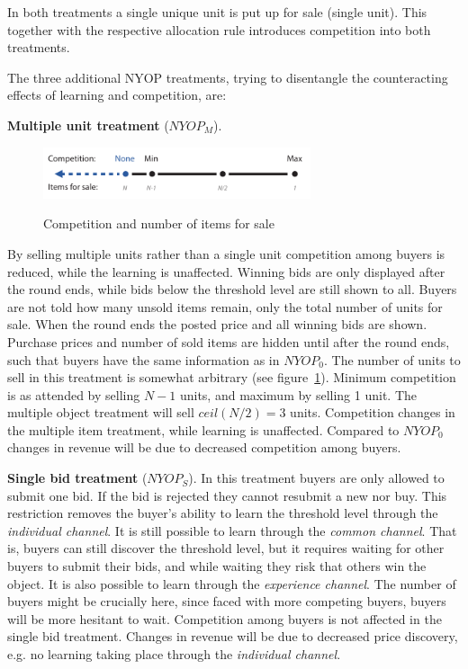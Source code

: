 \documentclass[a4paper,12pt]{article}
\begin{document}
	In both treatments a single unique unit is put up for sale (single unit). This together with the respective allocation rule introduces competition into both treatments.

	The three additional NYOP treatments, trying to disentangle the counteracting effects of learning and competition, are:

	{\bf Multiple unit treatment} ($NYOP_M$). 
	
	\begin{figure}[h]
	        \centering
	        \caption{Competition and number of items for sale}
	        \includegraphics[width=0.7\textwidth]{Figures/Competition-Items}
			\label{fig:competition-items}
	\end{figure}
	
	By selling multiple units rather than a single unit competition among buyers is reduced, while the learning is unaffected. Winning bids are only displayed after the round ends, while bids below the threshold level are still shown to all. Buyers are not told how many unsold items remain, only the total number of units for sale. When the round ends the posted price and all winning bids are shown. Purchase prices and number of sold items are hidden until after the round ends, such that buyers have the same information as in $NYOP_0$. The number of units to sell in this treatment is somewhat arbitrary (see figure~\ref{fig:competition-items}). Minimum competition is as attended by selling $N-1$ units, and maximum by selling 1 unit. The multiple object treatment will sell $ceil(N/2)=3$ units. Competition changes in the multiple item treatment, while learning is unaffected. Compared to $NYOP_0$ changes in revenue will be due to decreased competition among buyers.

	{\bf Single bid treatment} ($NYOP_S$).
	In this treatment buyers are only allowed to submit one bid. If the bid is rejected they cannot resubmit a new nor buy. This restriction removes the buyer's ability to learn the threshold level through the \emph{individual channel}. It is still possible to learn through the \emph{common channel}. That is, buyers can still discover the threshold level, but it requires waiting for other buyers to submit their bids, and while waiting they risk that others win the object. It is also possible to learn through the \emph{experience channel}. The number of buyers might be crucially here, since faced with more competing buyers, buyers will be more hesitant to wait. Competition among buyers is not affected in the single bid treatment. Changes in revenue will be due to decreased price discovery, e.g. no learning taking place through the \emph{individual channel}.
\end{document}
